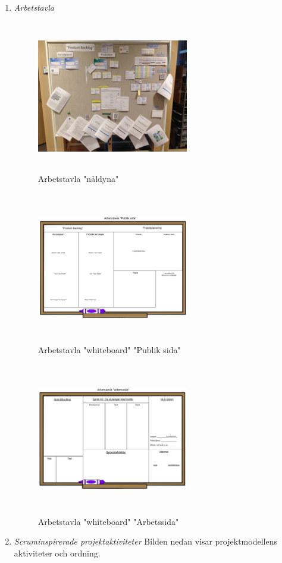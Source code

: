 \begin{enumerate}
    \item \textit{Arbetstavla}
    \begin{figure}[htbp]
        \centerline{\includegraphics[max height=250px, max width=250px]{Z. images/arbetstavla.jpg}}
        \caption{Arbetstavla "nåldyna"}
        \label{fig}
    \end{figure}
    
    \begin{figure}[htbp]
        \centerline{\includegraphics[max height=250px, max width=250px]{Z. images/lucidtavla.png}}
        \caption{Arbetstavla "whiteboard" "Publik sida"}
        \label{fig}
    \end{figure}

    \begin{figure}[htbp]
        \centerline{\includegraphics[max height=250px, max width=250px]{Z. images/lucidbaksida.png}}
        \caption{Arbetstavla "whiteboard" "Arbetssida"}
        \label{fig}
    \end{figure}
    \item \textit{Scruminspirerade projektaktiviteter}
    Bilden nedan visar projektmodellens aktiviteter och ordning.


\end{enumerate}
